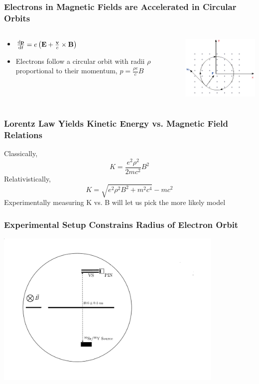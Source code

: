 \documentclass{beamer}
\begin{document}
\begin{frame}
  \frametitle{Electrons in Magnetic Fields are Accelerated in Circular Orbits}
  \begin{columns}
    \begin{column}{0.5\textwidth}
      \begin{itemize}
        \item
          $\dv{\vb{p}}{t} = e \left(\vb{E} + \frac{\vb{v}}{c} \times \vb{B}\right)$
        \item Electrons follow a circular orbit with radii $\rho$ proportional to their momentum, $p = \frac{\rho e}{c} B$
      \end{itemize}
\end{column}
    \begin{column}{0.5\textwidth}
  \includegraphics[width=6cm]{lorentz.png}
\end{column}
\end{columns}
\end{frame}

\begin{frame}
  \frametitle{Lorentz Law Yields Kinetic Energy vs. Magnetic Field Relations}
  Classically,
  \begin{equation*}
    K = \frac{e^2 \rho^2}{2mc^2} B^2
  \end{equation*}
  Relativistically,
  \begin{equation*}
    K = \sqrt{e^2 \rho^2 B^2 + m^2 c^4} - mc^2
  \end{equation*}
  Experimentally measuring K vs. B will let us pick the more likely model
\end{frame}

\begin{frame}
  \frametitle{Experimental Setup Constrains Radius of Electron Orbit}
  \includegraphics[width=11cm]{setup1.png}
\end{frame}
\end{document}
